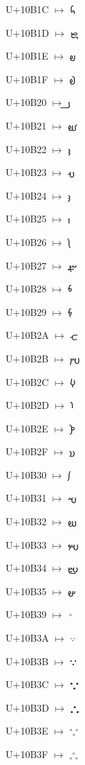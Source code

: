 {\noindent U+10B1C $\mapsto$ {\avfont 𐬜}\par
\noindent U+10B1D $\mapsto$ {\avfont 𐬝}\par
\noindent U+10B1E $\mapsto$ {\avfont 𐬞}\par
\noindent U+10B1F $\mapsto$ {\avfont 𐬟}\par
\noindent U+10B20 $\mapsto$ {\avfont 𐬠}\par
\noindent U+10B21 $\mapsto$ {\avfont 𐬡}\par
\noindent U+10B22 $\mapsto$ {\avfont 𐬢}\par
\noindent U+10B23 $\mapsto$ {\avfont 𐬣}\par
\noindent U+10B24 $\mapsto$ {\avfont 𐬤}\par
\noindent U+10B25 $\mapsto$ {\avfont 𐬥}\par
\noindent U+10B26 $\mapsto$ {\avfont 𐬦}\par
\noindent U+10B27 $\mapsto$ {\avfont 𐬧}\par
\noindent U+10B28 $\mapsto$ {\avfont 𐬨}\par
\noindent U+10B29 $\mapsto$ {\avfont 𐬩}\par
\noindent U+10B2A $\mapsto$ {\avfont 𐬪}\par
\noindent U+10B2B $\mapsto$ {\avfont 𐬫}\par
\noindent U+10B2C $\mapsto$ {\avfont 𐬬}\par
\noindent U+10B2D $\mapsto$ {\avfont 𐬭}\par
\noindent U+10B2E $\mapsto$ {\avfont 𐬮}\par
\noindent U+10B2F $\mapsto$ {\avfont 𐬯}\par
\noindent U+10B30 $\mapsto$ {\avfont 𐬰}\par
\noindent U+10B31 $\mapsto$ {\avfont 𐬱}\par
\noindent U+10B32 $\mapsto$ {\avfont 𐬲}\par
\noindent U+10B33 $\mapsto$ {\avfont 𐬳}\par
\noindent U+10B34 $\mapsto$ {\avfont 𐬴}\par
\noindent U+10B35 $\mapsto$ {\avfont 𐬵}\par
\noindent U+10B39 $\mapsto$ {\avfont 𐬹}\par
\noindent U+10B3A $\mapsto$ {\avfont 𐬺}\par
\noindent U+10B3B $\mapsto$ {\avfont 𐬻}\par
\noindent U+10B3C $\mapsto$ {\avfont 𐬼}\par
\noindent U+10B3D $\mapsto$ {\avfont 𐬽}\par
\noindent U+10B3E $\mapsto$ {\avfont 𐬾}\par
\noindent U+10B3F $\mapsto$ {\avfont 𐬿}\par
}



